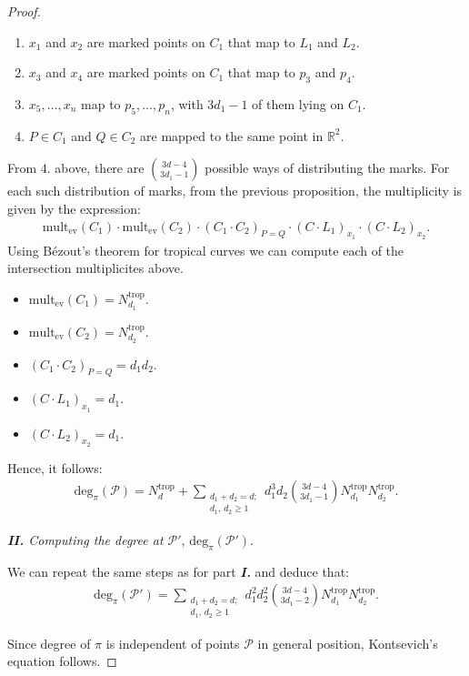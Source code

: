 \begin{proof}
\begin{enumerate}
        \item $x_{1}$ and $x_{2}$ are marked points on $C_{1}$ that map to $L_{1}$ and $L_{2}$.
        \item $x_{3}$ and $x_{4}$ are marked points on $C_{1}$ that map to $p_{3}$ and $p_{4}$.
        \item $x_{5},\dots,x_{n}$ map to $p_{5},\dots,p_{n}$, with $3d_{1}-1$ of them lying on $C_{1}$.
        \item $P \in C_{1}$ and $Q \in C_{2}$ are mapped to the same point in $\mathbb{R}^{2}$.
    \end{enumerate}
    From $4.$ above, there are $\binom{3d-4}{3d_{1}-1}$ possible ways of distributing the marks.
    For each such distribution of marks, from the previous proposition, the multiplicity is given by the expression:
    \begin{align*}
        \text{mult}_{\text{ev}}(C_{1}) \cdot \text{mult}_{\text{ev}}(C_{2}) \cdot (C_{1}\cdot C_{2})_{P=Q} \cdot (C\cdot L_{1})_{x_{1}} \cdot (C\cdot L_{2})_{x_{2}}.
    \end{align*}
    Using B\'{e}zout's theorem for tropical curves we can compute each of the intersection multiplicites above.
    \begin{itemize}
        \item $\text{mult}_{\text{ev}}(C_{1}) = N^{\text{trop}}_{d_{1}}$.
        \item $\text{mult}_{\text{ev}}(C_{2}) = N^{\text{trop}}_{d_{2}}$.
        \item $(C_{1}\cdot C_{2})_{P=Q} = d_{1}d_{2}$.
        \item $(C\cdot L_{1})_{x_{1}} = d_{1}$.
        \item $(C\cdot L_{2})_{x_{2}} = d_{1}$.
    \end{itemize}
    Hence, it follows:
    \begin{align*}
        \text{deg}_{\pi}(\mathcal{P}) = N_{d}^{\text{trop}} + \sum_{\substack{d_{1}+d_{2}=d;\\ d_{1},\,d_{2}\geq1}}
        d_{1}^{3}d_{2}\binom{3d-4}{3d_{1}-1}  N^{\text{trop}}_{d_{1}}N^{\text{trop}}_{d_{2}}.
    \end{align*}
    \par \textit{\textbf{II.} Computing the degree at $\mathcal{P}'$}, $\text{deg}_{\pi}(\mathcal{P}')$.
    \par We can repeat the same steps as for part \textit{\textbf{I.}} and deduce that:
    \begin{align*}
        \text{deg}_{\pi}(\mathcal{P}') =  \sum_{\substack{d_{1}+d_{2}=d;\\ d_{1},\,d_{2}\geq1}}
        d_{1}^{2}d_{2}^{2}\binom{3d-4}{3d_{1}-2}  N^{\text{trop}}_{d_{1}}N^{\text{trop}}_{d_{2}}.
    \end{align*}

    Since degree of $\pi$ is independent of points $\mathcal{P}$ in general position, Kontsevich's equation follows.
\end{proof}
